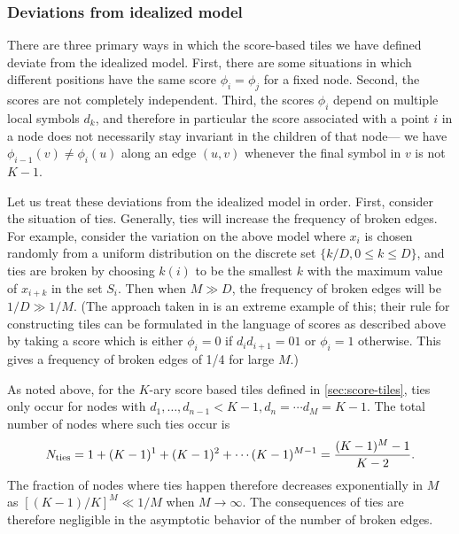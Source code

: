 \documentclass[12pt]{article}
\begin{document}
\subsubsection{Deviations from idealized model}

There are  three primary ways in which the score-based tiles we have
defined deviate from the idealized model.  First, there are some
situations in which different positions have the same score $\phi_i =
\phi_j$ for a fixed node.  Second, the scores are not completely
independent.  Third, the scores $\phi_i$ depend on multiple local
symbols $d_k$, and therefore in particular the score associated with a
point $i$ in a node does not necessarily stay invariant in the
children of that node--- we  have $\phi_{i -1} (v) \neq
\phi_{i} (u)$ along an edge $(u, v)$ whenever the final symbol in $v$
is not $K -1$.

Let us treat these deviations from the idealized model in order.
First, consider the situation of ties.  Generally, ties will increase
the frequency of broken edges.  For example, consider the variation on
the above model where $x_i$ is chosen randomly from a uniform
distribution on the discrete set $\{k/D, 0 \leq k \leq D\}$, and ties
are broken by choosing $k (i)$ to be the smallest $k$ with the maximum
value of $x_{i + k}$ in the set $S_i$.  Then when $M\gg D$, the
frequency of broken edges will be $1/D\gg 1/M$.  (The approach taken
in \cite{Viterbi} is an extreme example of this; their rule for
constructing tiles can be formulated in the language of scores as
described above by taking a score which is either $\phi_i = 0$ if $d_i
d_{i + 1} = 01$ or $\phi_i = 1$ otherwise.  This gives a frequency of
broken edges of 1/4 for large $M$.)

As noted above,  for the $K$-ary score based tiles defined in 
\ref{sec:score-tiles},
ties
only occur for nodes with $d_1, \ldots, d_{n -1} < K -1, d_n = \cdots
d_M = K -1$.  The total number of nodes where such ties occur is
\begin{equation}
N_{\rm ties} = 1 + (K-1)^1 + (K -1)^2 + \cdots (K -1)^{M -1}
=\frac{(K -1)^M -1}{K-2}.
\end{equation}
The fraction of nodes where ties happen therefore decreases
exponentially in $M$ as $[(K-1)/K]^M\ll 1/M$ when $M \rightarrow \infty$.
The consequences of ties are therefore negligible in the asymptotic
behavior of the number of broken edges.
\end{document}
